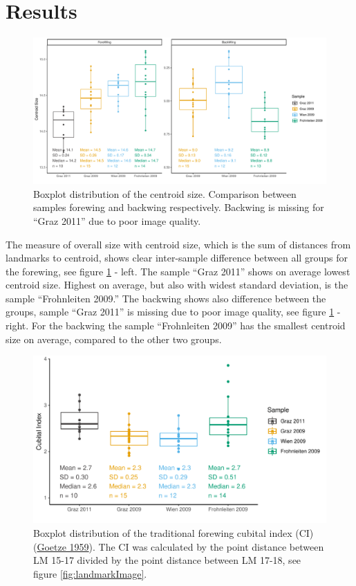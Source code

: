 \documentclass[
]{article}
\begin{document}
\hypertarget{results}{%
\section{Results}\label{results}}



\begin{figure}[H]

{\centering \includegraphics[width=0.7\linewidth,]{images/csPlot} 

}

\caption{Boxplot distribution of the centroid size. Comparison between samples forewing and backwing respectively. Backwing is missing for ``Graz 2011'' due to poor image quality.}\label{fig:csPlot}
\end{figure}

The measure of overall size with centroid size, which is the sum of distances from landmarks to centroid, shows clear inter-sample difference between all groups for the forewing, see figure \ref{fig:csPlot} - left. The sample ``Graz 2011'' shows on average lowest centroid size. Highest on average, but also with widest standard deviation, is the sample ``Frohnleiten 2009.'' The backwing shows also difference between the groups, sample ``Graz 2011'' is missing due to poor image quality, see figure \ref{fig:csPlot} - right. For the backwing the sample ``Frohnleiten 2009'' has the smallest centroid size on average, compared to the other two groups.



\begin{figure}[H]

{\centering \includegraphics[width=0.6\linewidth,]{images/ciPlot} 

}

\caption{Boxplot distribution of the traditional forewing cubital index (CI) (\protect\hyperlink{ref-goetze1959}{Goetze 1959}). The CI was calculated by the point distance between LM 15-17 divided by the point distance between LM 17-18, see figure \ref{fig:landmarkImage}.}\label{fig:ciPlot}
\end{figure}
\end{document}

